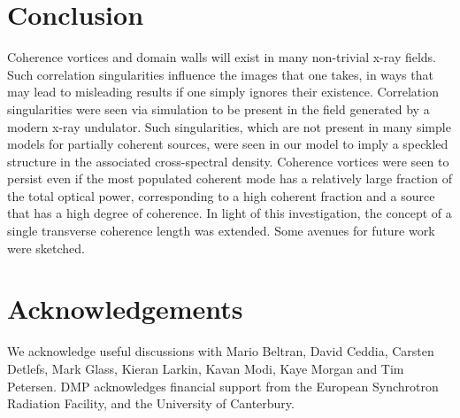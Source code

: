 \documentclass[%
 reprint,
 amsmath,amssymb,
 aps,
]{revtex4-1}
\begin{document}
\section{Conclusion}

Coherence vortices and domain walls will exist in many non-trivial x-ray fields.  Such correlation singularities influence the images that one takes, in ways that may lead to misleading results if one simply ignores their existence.  Correlation singularities were seen via simulation to be present in the field generated by a modern x-ray undulator. Such singularities, which are not present in many simple models for partially coherent sources, were seen in our model to imply a speckled structure in the associated cross-spectral density.  Coherence vortices were seen to persist even if the most populated coherent mode has a relatively large fraction of the total optical power, corresponding to a high coherent fraction and a source that has a high degree of coherence. In light of this investigation, the concept of a single transverse coherence length was extended.   Some avenues for future work were sketched.  

\section*{Acknowledgements}

We acknowledge useful discussions with Mario Beltran, David Ceddia, Carsten Detlefs, Mark Glass, Kieran Larkin, Kavan Modi, Kaye Morgan and Tim Petersen. DMP acknowledges financial support from the European Synchrotron Radiation Facility, and the University of Canterbury.  


\end{document}
